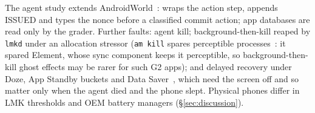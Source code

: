  The agent study extends AndroidWorld~\cite{rawles2025androidworld}: \sys wraps the action step, appends \textsf{ISSUED} and types the nonce before a
classified commit action; app databases are read only by the grader. Further faults: agent kill; background-then-kill reaped by \texttt{lmkd} under an
allocation stressor (\texttt{am kill} spares perceptible processes~\cite{android_adb}: it spared Element, whose sync component keeps it perceptible, so background-then-kill ghost effects may be
rarer for such G2 apps); and delayed recovery under Doze, App Standby buckets and Data
Saver~\cite{android_doze,android_standby}, which need the screen off and so matter only when the agent died and the phone slept. Physical phones differ in LMK thresholds and OEM battery managers (\S\ref{sec:discussion}).
